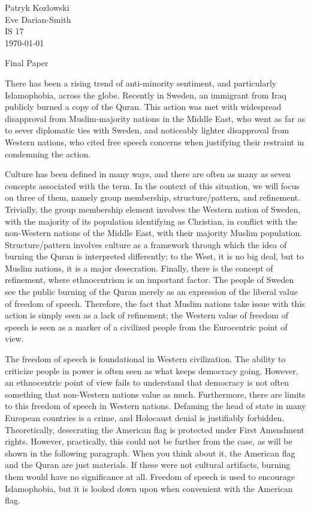 \documentclass[12pt,letterpaper]{article}
\renewcommand{\maketitle}{\makemlaheader}
\newcommand{\makemlaheader}{
Patryk Kozlowski \\
Eve Darian-Smith \\
IS 17\\
\today\\
\begin{center}\textnormal{Final Paper}\end{center}

}
\begin{document}
\begin{flushleft}


\maketitle




There has been a rising trend of anti-minority sentiment, and particularly Islamophobia, across the globe. Recently in Sweden, an immigrant from Iraq publicly burned a copy of the Quran. This action was met with widespread disapproval from Muslim-majority nations in the Middle East, who went as far as to sever diplomatic ties with Sweden, and noticeably lighter disapproval from Western nations, who cited free speech concerns when justifying their restraint in condemning the action. \autocite{noauthor_outcry_nodate}

Culture has been defined in many ways, and there are often as many as seven concepts associated with the term. \autocite{noauthor_what_nodate} In the context of this situation, we will focus on three of them, namely group membership, structure/pattern, and refinement. Trivially, the group membership element involves the Western nation of Sweden, with the majority of its population identifying as Christian, in conflict with the non-Western nations of the Middle East, with their majority Muslim population. Structure/pattern involves culture as a framework through which the idea of burning the Quran is interpreted differently; to the West, it is no big deal, but to Muslim nations, it is a major desecration. Finally, there is the concept of refinement, where ethnocentrism is an important factor. The people of Sweden see the public burning of the Quran merely as an expression of the liberal value of freedom of speech. Therefore, the fact that Muslim nations take issue with this action is simply seen as a lack of refinement; the Western value of freedom of speech is seen as a marker of a civilized people from the Eurocentric point of view.

The freedom of speech is foundational in Western civilization. The ability to criticize people in power is often seen as what keeps democracy going. However, an ethnocentric point of view fails to understand that democracy is not often something that non-Western nations value as much. Furthermore, there are limits to this freedom of speech in Western nations. Defaming the head of state in many European countries is a crime, and Holocaust denial is justifiably forbidden. \autocite{noauthor_burning_nodate} Theoretically, desecrating the American flag is protected under First Amendment rights. However, practically, this could not be further from the case, as will be shown in the following paragraph. When you think about it, the American flag and the Quran are just materials. If these were not cultural artifacts, burning them would have no significance at all. Freedom of speech is used to encourage Islamophobia, but it is looked down upon when convenient with the American flag.


\end{flushleft}
\end{document}
